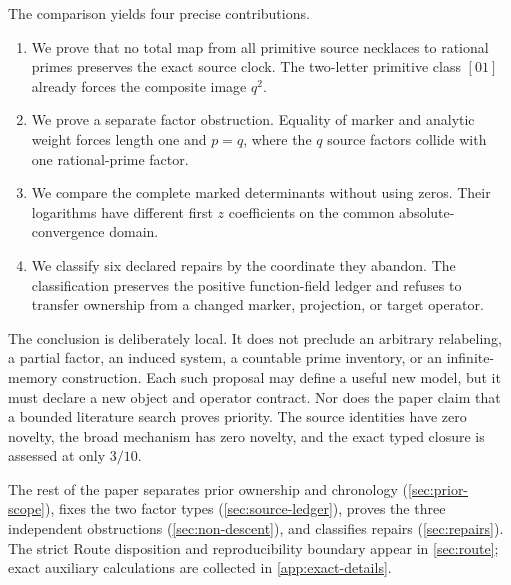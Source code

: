 The comparison yields four precise contributions.

\begin{enumerate}[label=(\roman*)]
\item We prove that no total map from all primitive source necklaces to
  rational primes preserves the exact source clock. The two-letter primitive
  class $[01]$ already forces the composite image $q^2$.
\item We prove a separate factor obstruction. Equality of marker and analytic
  weight forces length one and $p=q$, where the $q$ source factors collide
  with one rational-prime factor.
\item We compare the complete marked determinants without using zeros. Their
  logarithms have different first $z$ coefficients on the common
  absolute-convergence domain.
\item We classify six declared repairs by the coordinate they abandon. The
  classification preserves the positive function-field ledger and refuses to
  transfer ownership from a changed marker, projection, or target operator.
\end{enumerate}

The conclusion is deliberately local. It does not preclude an arbitrary
relabeling, a partial factor, an induced system, a countable prime inventory,
or an infinite-memory construction. Each such proposal may define a useful
new model, but it must declare a new object and operator contract. Nor does
the paper claim that a bounded literature search proves priority. The source
identities have zero novelty, the broad mechanism has zero novelty, and the
exact typed closure is assessed at only $3/10$.

The rest of the paper separates prior ownership and chronology
(\cref{sec:prior-scope}), fixes the two factor types
(\cref{sec:source-ledger}), proves the three independent obstructions
(\cref{sec:non-descent}), and classifies repairs
(\cref{sec:repairs}). The strict Route disposition and reproducibility
boundary appear in \cref{sec:route}; exact auxiliary calculations are collected
in \cref{app:exact-details}.
